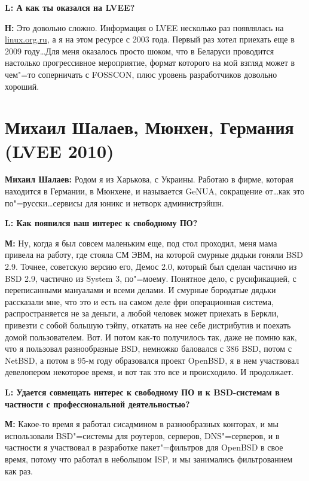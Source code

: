 \documentclass[10pt, a5paper]{article}
\begin{document}
{\noindent \bf L: А как ты оказался на LVEE?}

{\noindent \bf Н:} Это довольно сложно. Информация о LVEE несколько раз появлялась на \url{linux.org.ru}, а я на этом ресурсе с 2003 года. 
Первый раз хотел приехать еще в 2009 году\ldots Для меня оказалось просто шоком, что в Беларуси проводится настолько прогрессивное мероприятие, формат которого на мой взгляд может в чем"=то соперничать с FOSSCON, плюс уровень разработчиков довольно хороший. 

\section*{Михаил Шалаев, Мюнхен, Германия (LVEE 2010)}


{\noindent \bf Михаил Шалаев:} Родом я из Харькова, с Украины. Работаю в фирме, которая находится в Германии, в Мюнхене, и называется GeNUA, сокращение от\ldots  как это по"=русски\ldots сервисы для юникс и нетворк администрэйшн.

{\noindent \bf L: Как появился ваш интерес к свободному ПО?}

{\noindent \bf М:} Ну, когда я был совсем маленьким еще, под стол проходил, меня мама привела на работу, где стояла СМ ЭВМ, на которой смурные дядьки гоняли BSD 2.9. Точнее, советскую версию его, Демос 2.0, который был сделан частично из BSD 2.9, частично из System 3, по"=моему. Понятное дело, с русификацией, с переписанными мануалами и всеми делами. И смурные бородатые дядьки рассказали мне, что это и есть на самом деле фри операционная система, распространяется не за деньги, а любой человек может приехать в Беркли, привезти с собой большую тэйпу, откатать на нее себе дистрибутив и поехать домой пользователем. Вот. И потом как-то получилось так, даже не помню как, что я пользовал разнообразные BSD, немножко баловался с 386 BSD, потом с NetBSD, а потом в 95-м году образовался проект OpenBSD, я в нем участвовал девелопером некоторое время, и вот так это все и происходило. И продолжает.

{\noindent \bf L:  Удается совмещать интерес к свободному ПО и к BSD-системам в частности с профессиональной деятельностью?}

{\noindent \bf М:} Какое-то время я работал сисадмином в разнообразных конторах, и мы использовали BSD"=системы для роутеров, серверов, DNS"=серверов, и в частности я участвовал в разработке пакет"=фильтров для OpenBSD в свое время, потому что работал в небольшом ISP, и мы занимались фильтрованием как раз. 
\end{document}
